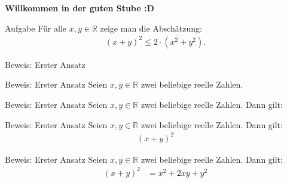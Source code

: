\documentclass[10pt]{beamer}
\title{}
\author{Artur's \( \oint \) Mathematikstübchen}
\date{}
\def\bR{\mathbb{R}}
\begin{document}

\begin{frame}
    \begin{center}
        \textbf{\huge Willkommen in der guten Stube \newline \newline :D}
    \end{center}
\end{frame}




\begin{frame}
    \begin{alertblock}{Aufgabe}
        Für alle \( x, y \in \bR \) zeige man die Abschätzung:
        \begin{align*}
            \left( x + y \right)^{2}
            \leq 2 \cdot \left( x^{2} + y^{2} \right).
        \end{align*}
    \end{alertblock}
\end{frame}



\begin{frame}{Beweis: Erster Ansatz}
    
\end{frame}



\begin{frame}{Beweis: Erster Ansatz}
    Seien \( x, y \in \bR \) zwei beliebige reelle Zahlen.
\end{frame}



\begin{frame}{Beweis: Erster Ansatz}
    Seien \( x, y \in \bR \) zwei beliebige reelle Zahlen. Dann gilt:
\end{frame}



\begin{frame}{Beweis: Erster Ansatz}
    Seien \( x, y \in \bR \) zwei beliebige reelle Zahlen. Dann gilt:
    \begin{align*}
        \left( x + y \right)^{2}
    \end{align*}
\end{frame}



\begin{frame}{Beweis: Erster Ansatz}
    Seien \( x, y \in \bR \) zwei beliebige reelle Zahlen. Dann gilt:
    \begin{align*}
        \left( x + y \right)^{2}
        & = x^{2} + 2xy + y^{2}
    \end{align*}
\end{frame}
\end{document}
